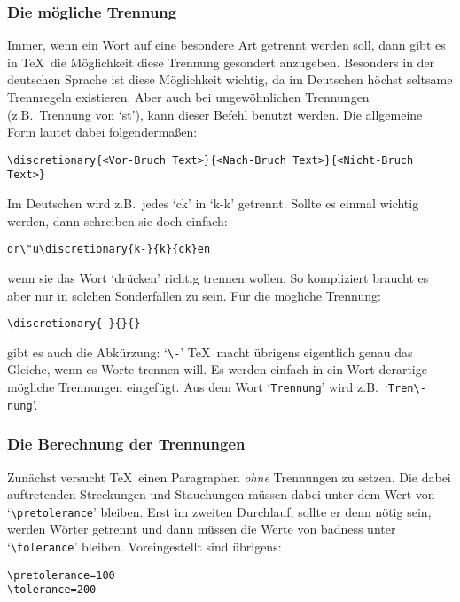 \subsubsection{Die m\"ogliche Trennung}
Immer, wenn ein Wort auf eine besondere Art getrennt werden soll, dann
gibt es in \TeX\ die M\"oglichkeit diese Trennung gesondert anzugeben.
Besonders in der deutschen Sprache ist diese M\"oglichkeit wichtig, da
im Deutschen h\"ochst seltsame Trennregeln existieren. Aber auch bei
ungew\"ohnlichen Trennungen (z.B.\ Trennung von `st'), kann dieser
Befehl benutzt werden. Die allgemeine Form lautet dabei
folgenderma\ss{}en:
\begin{verbatim}
\discretionary{<Vor-Bruch Text>}{<Nach-Bruch Text>}{<Nicht-Bruch Text>}
\end{verbatim}
Im Deutschen wird z.B.\ jedes `ck' in `k-k' getrennt. Sollte es einmal
wichtig werden, dann schreiben sie doch einfach:
\begin{verbatim}
dr\"u\discretionary{k-}{k}{ck}en
\end{verbatim}
wenn sie das Wort `dr\"ucken' richtig trennen wollen. So kompliziert
braucht es aber nur in solchen Sonderf\"allen zu sein. F\"ur die m\"ogliche
Trennung:
\begin{verbatim}
\discretionary{-}{}{}
\end{verbatim}
gibt es auch die Abk\"urzung: `\verb|\-|'
\TeX\ macht \"ubrigens eigentlich genau das Gleiche, wenn es Worte trennen
will. Es werden einfach in ein Wort derartige m\"ogliche Trennungen
eingef\"ugt. Aus dem Wort `\verb|Trennung|' wird z.B.\ `\verb|Tren\-nung|'.
\subsubsection{Die Berechnung der Trennungen}
Zun\"achst versucht \TeX\ einen Paragraphen {\em ohne} Trennungen zu
setzen. Die dabei auftretenden Streckungen und Stauchungen m\"ussen
dabei unter dem Wert von
`\verb|\pretolerance|' bleiben. Erst im
zweiten Durchlauf, sollte er denn n\"otig sein, werden W\"orter getrennt
und dann m\"ussen die Werte von 
badness unter `\verb|\tolerance|'
bleiben. Voreingestellt sind \"ubrigens:
\begin{verbatim}
\pretolerance=100
\tolerance=200
\end{verbatim}

